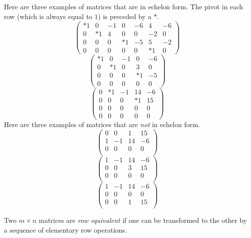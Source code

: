 \documentclass{ximera}
\begin{document}
Here are three examples of matrices that are in echelon form.
The pivot in each row (which is always equal to $1$) is preceded
by a $*$.
\[
\left(\begin{array}{rrrrrrr}
    *1   &  0   &  -1  &  0  &  -6  &   4  &  -6\\
     0   & *1   &  4   &  0  &   0  &  -2  &   0\\
     0   &  0   &  0   & *1  &  -5  &   5  &  -2\\
     0   &  0   &  0   &  0  &   0  &  *1  &   0
\end{array} \right)
\]
\[
\left(\begin{array}{rrrrr}
    *1 &   0  &  -1  &   0  &  -6 \\
     0 &  *1  &   0  &   3  &   0  \\
     0 &   0  &   0  &  *1  &  -5   \\
     0 &   0  &   0  &   0  &   0
\end{array} \right)
\]
\[
\left(\begin{array}{rrrrr}
     0  &  *1  &  -1  &  14  &  -6 \\
     0  &   0  &   0  &  *1  &  15  \\
     0  &   0  &   0  &   0  &   0   \\
     0  &   0  &   0  &   0  &   0
\end{array} \right)
\]
Here are three examples of matrices that are {\em not\/} in echelon form.
\[
\left(\begin{array}{rrrr}
     0  &   0  &   1  &  15  \\
     1  &  -1  &  14  &  -6 \\
     0  &   0  &   0  &   0   \\
\end{array} \right)
\]
\[
\left(\begin{array}{rrrr}
     1  &  -1  &  14  &  -6 \\
     0  &   0  &   3  &  15  \\
     0  &   0  &   0  &   0   \\
\end{array} \right)
\]
\[
\left(\begin{array}{rrrr}
     1  &  -1  &  14  &  -6 \\
     0  &   0  &   0  &   0   \\
     0  &   0  &   1  &  15  \\
\end{array} \right)
\]


\begin{definition} \label{D:roweq}
Two $m\times n$ matrices are {\em row equivalent\/} if one can be
transformed to the other by a sequence of elementary row
operations.
\end{definition}
\end{document}
